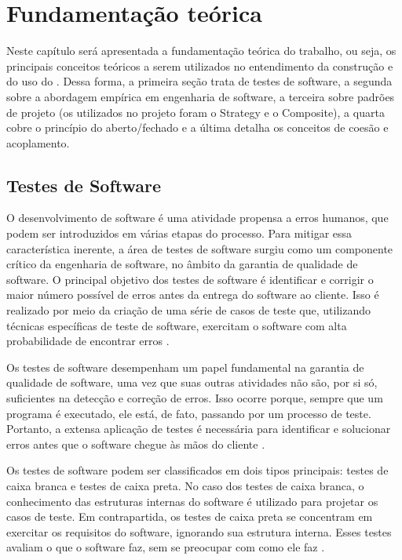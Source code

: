 \documentclass[12pt]{tcc}
\begin{document}
\chapter{Fundamentação teórica}
	\label{cap:fundamentacao_teorica}

		Neste capítulo será apresentada a fundamentação teórica do trabalho, ou seja, os principais conceitos teóricos a serem utilizados no entendimento da construção e do uso do .
		Dessa forma, a primeira seção trata de testes de software, a segunda sobre a abordagem empírica em engenharia de software, a terceira sobre padrões de projeto (os utilizados no projeto foram o Strategy e o Composite), a quarta cobre o princípio do aberto/fechado e a última detalha os conceitos de coesão e acoplamento.

		\section{Testes de Software}
		\label{cap:software-testing}
		O desenvolvimento de software é uma atividade propensa a erros humanos, que podem ser introduzidos em várias etapas do processo.
		Para mitigar essa característica inerente, a área de testes de software surgiu como um componente crítico da engenharia de software, no âmbito da garantia de qualidade de software.
		O principal objetivo dos testes de software é identificar e corrigir o maior número possível de erros antes da entrega do software ao cliente.
		Isso é realizado por meio da criação de uma série de casos de teste que, utilizando técnicas específicas de teste de software, exercitam o software com alta probabilidade de encontrar erros \citep{pressman2009software}.

		Os testes de software desempenham um papel fundamental na garantia de qualidade de software, uma vez que suas outras atividades não são, por si só, suficientes na detecção e correção de erros.
		Isso ocorre porque, sempre que um programa é executado, ele está, de fato, passando por um processo de teste.
		Portanto, a extensa aplicação de testes é necessária para identificar e solucionar erros antes que o software chegue às mãos do cliente \citep{pressman2009software}.

		Os testes de software podem ser classificados em dois tipos principais: testes de caixa branca e testes de caixa preta.
		No caso dos testes de caixa branca, o conhecimento das estruturas internas do software é utilizado para projetar os casos de teste.
		Em contrapartida, os testes de caixa preta se concentram em exercitar os requisitos do software, ignorando sua estrutura interna. Esses testes avaliam o que o software faz, sem se preocupar com como ele faz \citep{pressman2009software}.
\end{document}
